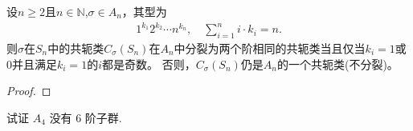 \documentclass[../../main.tex]{subfiles}%
\begin{document}
\begin{theorem}\label{theorem:交错群共轭类计算的分裂定理}
设$n\geqslant 2$且$n\in \mathbb{N}$,$\sigma \in A_n$，其型为
\begin{align*}
1^{k_1}2^{k_2}\cdots n^{k_n},\quad \sum\limits_{i=1}^n{i\cdot k_i}=n.
\end{align*}
则$\sigma$在$S_n$中的共轭类$C_{\sigma}(S_n)$在$A_n$中分裂为两个阶相同的共轭类当且仅当$k_i=1$或$0$并且满足$k_i=1$的$i$都是奇数。
否则，$C_{\sigma}(S_n)$仍是$A_n$的一个共轭类(不分裂)。
\end{theorem}
\begin{proof}

\end{proof}

\begin{example}\label{example:A4的正规子群的计算}
试证 $A_4$ 没有 6 阶子群.
\end{example}
\end{document}
